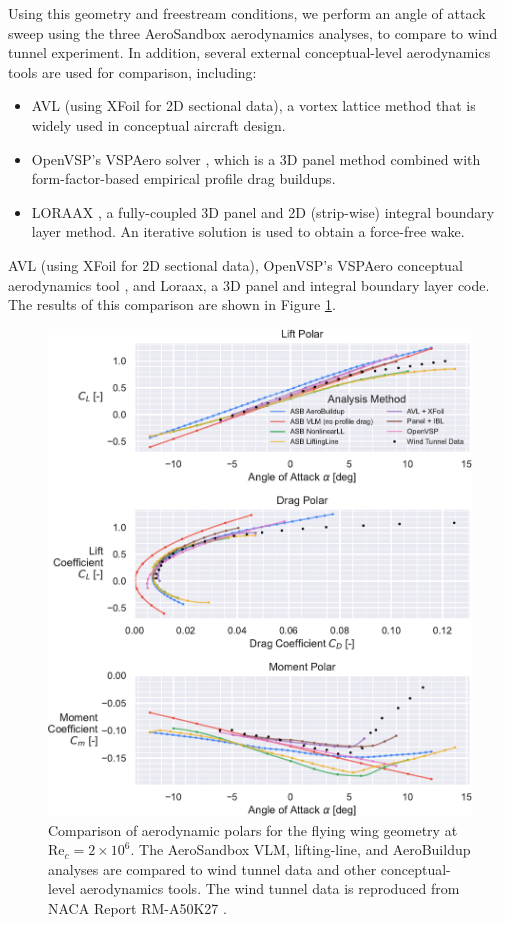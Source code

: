 Using this geometry and freestream conditions, we perform an angle of attack sweep using the three AeroSandbox aerodynamics analyses, to compare to wind tunnel experiment. In addition, several external conceptual-level aerodynamics tools are used for comparison, including:
\begin{itemize}[noitemsep]
    \item AVL \cite{avl} (using XFoil \cite{drela_xfoil_1989} for 2D sectional data), a vortex lattice method that is widely used in conceptual aircraft design.
    \item OpenVSP's VSPAero solver \cite{mcdonald_open_2022}, which is a 3D panel method combined with form-factor-based empirical profile drag buildups.
    \item LORAAX \cite{loraax}, a fully-coupled 3D panel and 2D (strip-wise) integral boundary layer method. An iterative solution is used to obtain a force-free wake.
\end{itemize}

AVL \cite{avl} (using XFoil \cite{drela_xfoil_1989} for 2D sectional data), OpenVSP's VSPAero conceptual aerodynamics tool \cite{mcdonald_open_2022}, and Loraax, a 3D panel and integral boundary layer code. The results of this comparison are shown in Figure \ref{fig:fw_results}.

\begin{figure}[!htb]
    \centering
    \includegraphics[width=\textwidth]{../figures/aero_validation/flying_wing_polars-crop.pdf}
    \caption{Comparison of aerodynamic polars for the flying wing geometry at $\text{Re}_c=2 \times 10^6$. The AeroSandbox VLM, lifting-line, and AeroBuildup analyses are compared to wind tunnel data and other conceptual-level aerodynamics tools. The wind tunnel data is reproduced from NACA Report RM-A50K27 \cite{tinling_effects_1951}.}
    \label{fig:fw_results}
\end{figure}

